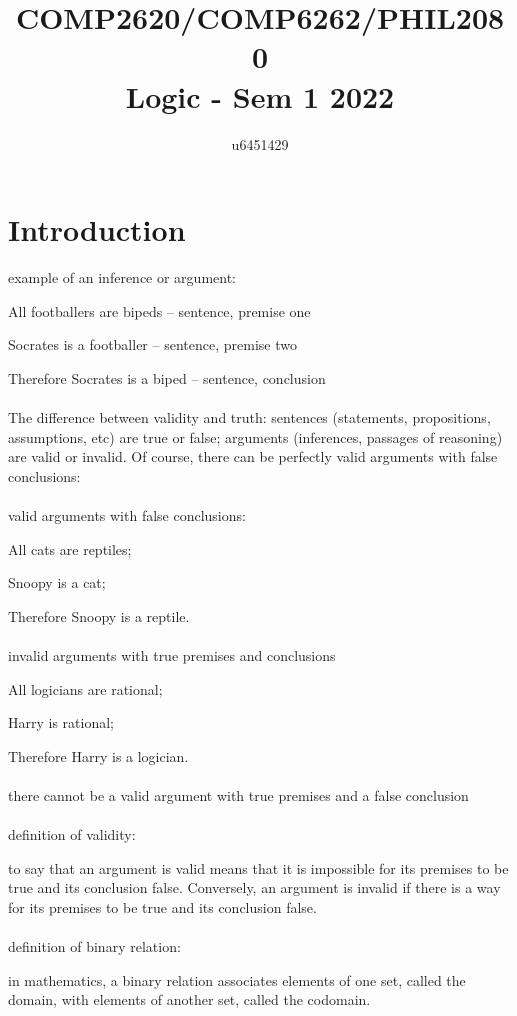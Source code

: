 \documentclass{article}
\title{COMP2620/COMP6262/PHIL2080 \\ Logic - Sem 1 2022}
\author{u6451429}
\begin{document}
  
\maketitle
  
\tableofcontents

\pagebreak
\section{Introduction}
example of an inference or argument:

All footballers are bipeds -- sentence, premise one

Socrates is a footballer -- sentence, premise two

Therefore Socrates is a biped -- sentence, conclusion
\\\\
The difference between validity and truth: sentences (statements, propositions, assumptions, etc) are true or false; arguments (inferences, passages of reasoning) are valid or invalid. Of course, there can be perfectly valid arguments with false conclusions:
\\\\
valid arguments with false conclusions:

All cats are reptiles;

Snoopy is a cat;

Therefore Snoopy is a reptile.
\\\\
invalid arguments with true premises and conclusions

All logicians are rational;

Harry is rational;

Therefore Harry is a logician.
\\\\
there cannot be a valid argument with true premises and a false conclusion
\\\\
definition of validity: 

to say that an argument is valid means that it is impossible for its premises to be true and its conclusion false. Conversely, an argument is invalid if there is a way for its premises to be true and its conclusion false.
\\\\
definition of binary relation:

in mathematics, a binary relation associates elements of one set, called the domain, with elements of another set, called the codomain.
\end{document}
